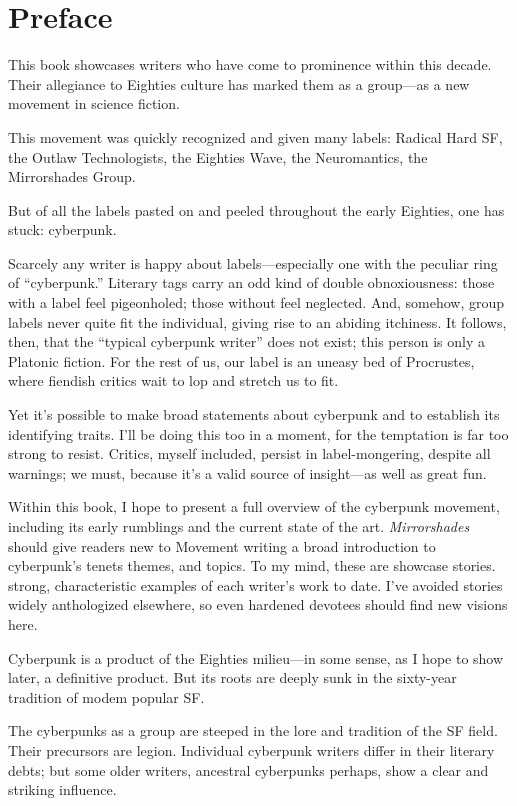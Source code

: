 \chapter{Preface}

This book showcases writers who have come to prominence within this decade. Their allegiance to Eighties culture has marked them as a group---as a new movement in science fiction.

This movement was quickly recognized and given many labels: Radical Hard SF, the Outlaw Technologists, the Eighties Wave, the Neuromantics, the Mirrorshades Group.

But of all the labels pasted on and peeled throughout the early Eighties, one has stuck: cyberpunk.

Scarcely any writer is happy about labels---especially one with the peculiar ring of ``cyberpunk.'' Literary tags carry an odd kind of double obnoxiousness: those with a label feel pigeonholed; those without feel neglected. And, somehow, group labels never quite fit the individual, giving rise to an abiding itchiness. It follows, then, that the ``typical cyberpunk writer'' does not exist; this person is only a Platonic fiction. For the rest of us, our label is an uneasy bed of Procrustes, where fiendish critics wait to lop and stretch us to fit.

Yet it's possible to make broad statements about cyberpunk and to establish its identifying traits. I'll be doing this too in a moment, for the temptation is far too strong to resist. Critics, myself included, persist in label-mongering, despite all warnings; we must, because it's a valid source of insight---as well as great fun.

Within this book, I hope to present a full overview of the cyberpunk movement, including its early rumblings and the current state of the art. \textit{Mirrorshades} should give readers new to Movement writing a broad introduction to cyberpunk's tenets themes, and topics. To my mind, these are showcase stories. strong, characteristic examples of each writer's work to date. I've avoided stories widely anthologized elsewhere, so even hardened devotees should find new visions here.

Cyberpunk is a product of the Eighties milieu---in some sense, as I hope to show later, a definitive product. But its roots are deeply sunk in the sixty-year tradition of modem popular SF.

The cyberpunks as a group are steeped in the lore and tradition of the SF field. Their precursors are legion. Individual cyberpunk writers differ in their literary debts; but some older writers, ancestral cyberpunks perhaps, show a clear and striking influence.

